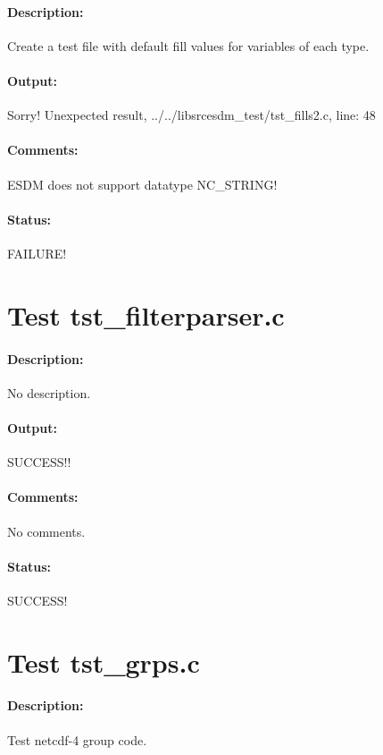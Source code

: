 \paragraph{Description:} Create a test file with default fill values for variables of each type.

\paragraph{Output:} Sorry! Unexpected result, ../../libsrcesdm\_test/tst\_fills2.c, line: 48

\paragraph{Comments:} ESDM does not support datatype NC\_STRING!

\paragraph{Status:} FAILURE!

\section{Test tst\_filterparser.c}

\paragraph{Description:} No description.

\paragraph{Output:} SUCCESS!!

\paragraph{Comments:} No comments.

\paragraph{Status:} SUCCESS!

\section{Test tst\_grps.c}

\paragraph{Description:} Test netcdf-4 group code.

